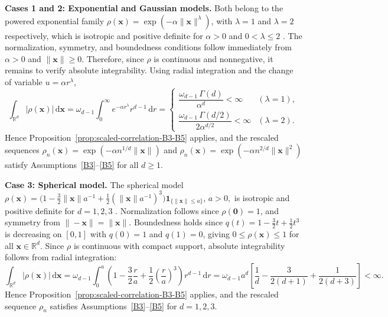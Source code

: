 \documentclass[12pt]{report} %
\newcommand{\bx}{\mathbf{x}}
\newcommand{\rd}{\mathrm{d}}
\begin{document}
\textbf{Cases 1 and 2: Exponential and Gaussian models.} 
Both belong to the powered exponential family $\rho(\bx)=\exp(-\alpha\|\bx\|^\lambda)$, with $\lambda=1$ and $\lambda=2$ respectively, which is isotropic and positive definite for $\alpha>0$ and $0<\lambda\leq 2$ \citep{Gneiting2013}. The normalization, symmetry, and boundedness conditions follow immediately from $\alpha>0$ and $\|\bx\|\geq 0$. Therefore, since $\rho$ is continuous and nonnegative, it remains to verify absolute integrability. Using radial integration and the change of variable $u=\alpha r^\lambda$,
\begin{equation*}
\int_{\mathbb{R}^d}|\rho(\bx)|\,\rd\bx = \omega_{d-1}\int_0^\infty e^{-\alpha r^\lambda}r^{d-1}\,\rd r = \begin{cases} \dfrac{\omega_{d-1}\,\Gamma(d)}{\alpha^d} < \infty & (\lambda=1),\\[8pt] \dfrac{\omega_{d-1}\,\Gamma(d/2)}{2\alpha^{d/2}} < \infty & (\lambda=2). \end{cases}
\end{equation*}
Hence Proposition~\ref{prop:scaled-correlation-B3-B5} applies, and the rescaled sequences $\rho_n(\bx)=\exp(-\alpha n^{1/d}\|\bx\|)$ and $\rho_n(\bx)=\exp(-\alpha n^{2/d}\|\bx\|^2)$ satisfy Assumptions~\ref{B3}--\ref{B5} for all $d\geq 1$.

\textbf{Case 3: Spherical model.} The spherical model $\rho(\bx)=\bigl(1-\tfrac{3}{2}\|\bx\|a^{-1}+\tfrac{1}{2}(\|\bx\|a^{-1})^3\bigr)\mathbf{1}_{\{\|\bx\|\leq a\}}$, $a>0,$ is isotropic and positive definite for $d=1,2,3$ \citep{Yingcai2022}. Normalization follows since $\rho(\mathbf{0})=1$, and symmetry from $\|-\bx\|=\|\bx\|$. Boundedness holds since $q(t)=1-\frac{3}{2}t+\frac{1}{2}t^3$ is decreasing on $[0,1]$ with $q(0)=1$ and $q(1)=0$, giving $0\leq\rho(\bx)\leq 1$ for all $\bx\in\mathbb{R}^d$. Since $\rho$ is continuous with compact support, absolute integrability follows from radial integration:
\begin{equation*}
\int_{\mathbb{R}^d}|\rho(\bx)|\,\rd\bx = \omega_{d-1}\int_0^a\left(1-\frac{3}{2}\frac{r}{a}+\frac{1}{2}\left(\frac{r}{a}\right)^3\right)r^{d-1}\,\rd r = \omega_{d-1}a^d\left[\frac{1}{d}-\frac{3}{2(d+1)}+\frac{1}{2(d+3)}\right]<\infty.
\end{equation*}
Hence Proposition~\ref{prop:scaled-correlation-B3-B5} applies, and the rescaled sequence $\rho_n$ satisfies Assumptions~\ref{B3}--\ref{B5} for $d=1,2,3$.
\end{document}
